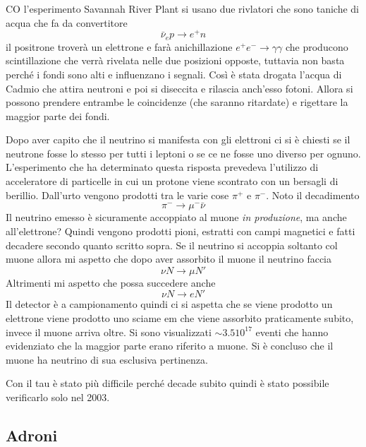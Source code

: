 \documentclass[12pt]{book}
\begin{document}
 CO l'esperimento Savannah River Plant si usano due rivlatori che sono taniche di acqua che fa da convertitore 
 \begin{equation}
 	\bar \nu_e p \rightarrow e^+ n
 \end{equation}
 il positrone troverà un elettrone e farà anichillazione $e^+e^- \rightarrow \gamma \gamma$ che producono scintillazione che verrà rivelata nelle due posizioni opposte, tuttavia non basta perché i fondi sono alti e influenzano i segnali. Così è stata drogata l'acqua di Cadmio che attira neutroni e poi si diseccita e rilascia anch'esso fotoni. Allora si possono prendere entrambe le coincidenze (che saranno ritardate) e rigettare la maggior parte dei fondi.
 
 Dopo aver capito che il neutrino si manifesta con gli elettroni ci si è chiesti se il neutrone fosse lo stesso per tutti i leptoni o se ce ne fosse uno diverso per ognuno. L'esperimento che ha determinato questa risposta prevedeva l'utilizzo di acceleratore di particelle in cui un protone viene scontrato con un bersagli di berillio. Dall'urto vengono prodotti tra le varie cose $\pi^+$ e $\pi^-$. Noto il decadimento 
 \begin{equation}
 	\pi^- \rightarrow \mu^- \bar \nu 
 \end{equation}
 Il neutrino emesso è sicuramente accoppiato al muone \emph{in produzione}, ma anche all'elettrone?
 Quindi vengono prodotti pioni, estratti con campi magnetici e fatti decadere secondo quanto scritto sopra. Se il neutrino si accoppia soltanto col muone allora mi aspetto che dopo aver assorbito il muone il neutrino faccia 
 \begin{equation}
 	\nu N \rightarrow \mu N'
 \end{equation}
 Altrimenti mi aspetto che possa succedere anche
 \begin{equation}
 	\nu N \rightarrow e N'
 \end{equation}
 Il detector è a campionamento quindi ci si aspetta che se viene prodotto un elettrone viene prodotto uno sciame em che viene assorbito praticamente subito, invece il muone arriva oltre. Si sono visualizzati $\sim 3.5 10^{17}$ eventi che hanno evidenziato che la maggior parte erano riferito a muone. Si è concluso che il muone ha neutrino di sua esclusiva pertinenza.
 
Con il tau è stato più difficile perché decade subito quindi è stato possibile verificarlo solo nel 2003.


\subsection{Adroni}
\end{document}
